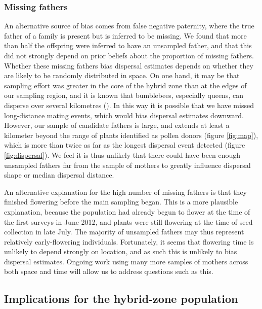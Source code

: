 \documentclass[10pt, a4paper, twocolumn]{article} %
\begin{document}
\subsubsection{Missing fathers}

An alternative source of bias comes from false negative paternity, where the true father of a family is present but is inferred to be missing.
We found that more than half the offspring were inferred to have an unsampled father, and that this did not strongly depend on prior beliefs about the proportion of missing fathers.
Whether these missing fathers bias dispersal estimates depends on whether they are likely to be randomly distributed in space.
On one hand, it may be that sampling effort was greater in the core of the hybrid zone than at the edges of our sampling region, and it is known that bumblebees, especially queens, can disperse over several kilometres (\cite{osborne2008bumblebee, hagen2011space, lepais2010estimation}).
In this way it is possible that we have missed long-distance mating events, which would bias dispersal estimates downward.
However, our sample of candidate fathers is large, and extends at least a kilometer beyond the range of plants identified as pollen donors (figure \ref{fig:map}), which is more than twice as far as the longest dispersal event detected (figure \ref{fig:dispersal}).
We feel it is thus unlikely that there could have been enough unsampled fathers far from the sample of mothers to greatly influence dispersal shape or median dispersal distance.

An alternative explanation for the high number of missing fathers is that they finished flowering before the main sampling began.
This is a more plausible explanation, because the population had already begun to flower at the time of the first surveys in June 2012, and plants were still flowering at the time of seed collection in late 
July.
The majority of unsampled fathers may thus represent relatively early-flowering individuals.
Fortunately, it seems that flowering time is unlikely to depend strongly on location, and as such this is unlikely to bias dispersal estimates.
Ongoing work using many more samples of mothers across both space and time will allow us to address questions such as this.

\subsection{Implications for the hybrid-zone population}
\end{document}
